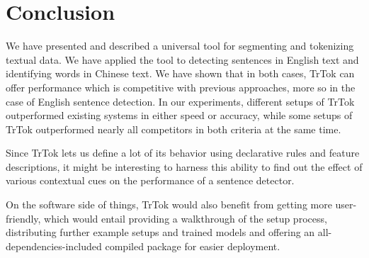 \section{Conclusion}
\label{sec:outro}

We have presented and described a universal tool for segmenting and
tokenizing textual data. We have applied the tool to detecting
sentences in English text and identifying words in Chinese text. We
have shown that in both cases, TrTok can offer performance which is
competitive with previous approaches, more so in the case of English
sentence detection. In our experiments, different setups of TrTok
outperformed existing systems in either speed or accuracy, while some
setups of TrTok outperformed nearly all competitors in both criteria
at the same time.

Since TrTok lets us define a lot of its behavior using declarative
rules and feature descriptions, it might be interesting to harness
this ability to find out the effect of various contextual cues on the
performance of a sentence detector.

On the software side of things, TrTok would also benefit from getting
more user-friendly, which would entail providing a walkthrough of the
setup process, distributing further example setups and trained models
and offering an all-dependencies-included compiled package for easier
deployment.
